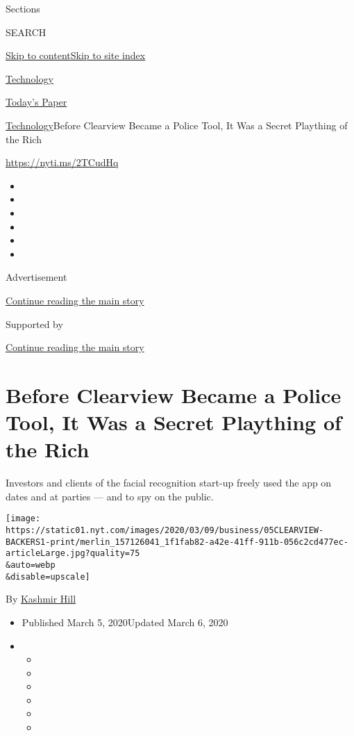 Sections

SEARCH

\protect\hyperlink{site-content}{Skip to
content}\protect\hyperlink{site-index}{Skip to site index}

\href{https://www.nytimes.com/section/technology}{Technology}

\href{https://myaccount.nytimes.com/auth/login?response_type=cookie\&client_id=vi}{}

\href{https://www.nytimes.com/section/todayspaper}{Today's Paper}

\href{/section/technology}{Technology}\textbar{}Before Clearview Became
a Police Tool, It Was a Secret Plaything of the Rich

\url{https://nyti.ms/2TCudHq}

\begin{itemize}
\item
\item
\item
\item
\item
\item
\end{itemize}

Advertisement

\protect\hyperlink{after-top}{Continue reading the main story}

Supported by

\protect\hyperlink{after-sponsor}{Continue reading the main story}

\hypertarget{before-clearview-became-a-police-tool-it-was-a-secret-plaything-of-the-rich}{%
\section{Before Clearview Became a Police Tool, It Was a Secret
Plaything of the
Rich}\label{before-clearview-became-a-police-tool-it-was-a-secret-plaything-of-the-rich}}

Investors and clients of the facial recognition start-up freely used the
app on dates and at parties --- and to spy on the public.

\texttt{[image: https://static01.nyt.com/images/2020/03/09/business/05CLEARVIEW-BACKERS1-print/merlin\_157126041\_1f1fab82-a42e-41ff-911b-056c2cd477ec-articleLarge.jpg?quality=75\\\&auto=webp\\\&disable=upscale]}

By \href{https://www.nytimes.com/by/kashmir-hill}{Kashmir Hill}

\begin{itemize}
\item
  Published March 5, 2020Updated March 6, 2020
\item
  \begin{itemize}
  \item
  \item
  \item
  \item
  \item
  \item
  \end{itemize}
\end{itemize}

